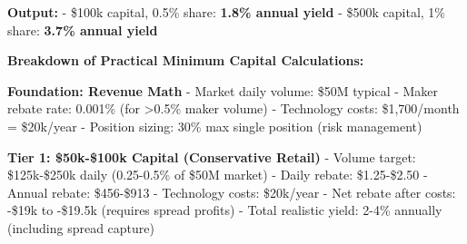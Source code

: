 \begin{Shaded}
\begin{Highlighting}[]
\OperatorTok{=}   
\OperatorTok{=}\OperatorTok{*}
\OperatorTok{=}\OperatorTok{*}   
\OperatorTok{=}\OperatorTok{*} 
\OperatorTok{=}\OperatorTok{/}\OperatorTok{*} 

\NormalTok{(}\SpecialCharTok{\{}\NormalTok{, }\NormalTok{)}\NormalTok{)}
\NormalTok{(}\SpecialCharTok{\{}\NormalTok{, }\NormalTok{)}\NormalTok{)}
\end{Highlighting}
\end{Shaded}

\textbf{Output:} - \$100k capital, 0.5\% share: \textbf{1.8\% annual
yield} - \$500k capital, 1\% share: \textbf{3.7\% annual yield}

\textbf{Breakdown of Practical Minimum Capital Calculations:}

\textbf{Foundation: Revenue Math} - Market daily volume: \$50M typical -
Maker rebate rate: 0.001\% (for \textgreater0.5\% maker volume) -
Technology costs: \$1,700/month = \$20k/year - Position sizing: 30\% max
single position (risk management)

\textbf{Tier 1: \$50k-\$100k Capital (Conservative Retail)} - Volume
target: \$125k-\$250k daily (0.25-0.5\% of \$50M market) - Daily rebate:
\$1.25-\$2.50 - Annual rebate: \$456-\$913 - Technology costs:
\$20k/year - Net rebate after costs: -\$19k to -\$19.5k (requires spread
profits) - Total realistic yield: 2-4\% annually (including spread
capture)

